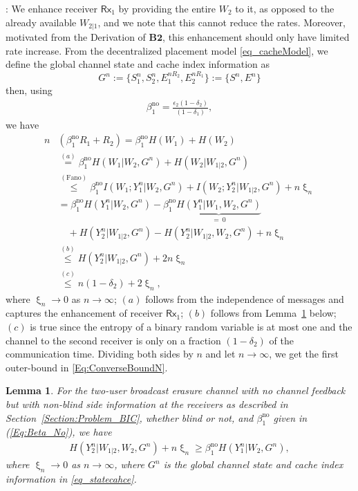 \documentclass[journal,12pt,draftcls,onecolumn]{IEEEtran}
\newtheorem{lemma}{Lemma}
\newcommand{\msf}{\mathsf}
\newcommand{\lp}{\left(}
\newcommand{\rp}{\right)}
\begin{document}
: We enhance receiver $\msf{Rx}_1$ by providing the entire $W_2$ to it, as opposed to the already available $W_{2|1}$, and we note that this cannot reduce the rates. Moreover, motivated from the Derivation of $\mathbf{B2}$, this enhancement should only have limited rate increase. From the decentralized placement model \eqref{eq_cacheModel}, we define the global channel state and cache index information as
\begin{equation} \label{eq_statecahce}
G^n:=\{S^n_1, S^n_2, E^{nR_2}_1, E^{nR_1}_2\}:=\{S^n, E^n\}
\end{equation}
then, using
\begin{align}
\beta_1^{\mathrm{no}} = \frac{\epsilon_2(1-\delta_2)}{(1-\delta_1)},
\end{align}
we have
\begin{align}
n &\left( \beta_1^{\mathrm{no}} R_1 + R_2 \right) = \beta_1^{\mathrm{no}} H(W_1) + H(W_2) \nonumber \\
& \overset{(a)}= \beta_1^{\mathrm{no}} H(W_1|W_2, G^n) + H(W_2|W_{1|2}, G^n) \nonumber \\
& \overset{(\mathrm{Fano})}\leq \beta_1^{\mathrm{no}} I(W_1;Y_1^n|W_2, G^n) + I(W_2;Y_2^n|W_{1|2}, G^n) + n \upxi_n \nonumber \\
& = \beta_1^{\mathrm{no}} H(Y_1^n|W_2, G^n) - \beta_1^{\mathrm{no}} \underbrace{H(Y_1^n|W_1,W_2,G^n)}_{=~0} \nonumber \\
& \quad + H(Y_2^n|W_{1|2},G^n) - H(Y_2^n|W_{1|2},W_2,G^n) + n \upxi_n \nonumber \\
& \overset{(b)}\leq H(Y_2^n|W_{1|2},G^n) + 2n \upxi_n \nonumber \\
& \overset{(c)}\leq n \left( 1 - \delta_2 \right) + 2\upxi_n,
\end{align}
where $\upxi_n \rightarrow 0$ as $n \rightarrow \infty$; $(a)$ follows from the independence of messages and captures the enhancement of receiver $\msf{Rx}_1$; $(b)$ follows from Lemma~\ref{Lemma:Leakage_BIC_No} below; $(c)$ is true since the entropy of a binary random variable is at most one and the channel to the second receiver is only on a fraction $\lp 1 - \delta_2 \rp$ of the communication time. Dividing both sides by $n$ and let $n \rightarrow \infty$, we get the first outer-bound in \eqref{Eq:ConverseBoundN}.

\begin{lemma}
\label{Lemma:Leakage_BIC_No}
For the two-user broadcast erasure channel with no channel feedback but with non-blind side information at the receivers as described in Section~\ref{Section:Problem_BIC}, whether blind or not, and $\beta_1^{\mathrm{no}}$ given in (\ref{Eq:Beta_No}), we have
\begin{align}
H\left( Y_2^n | W_{1|2}, W_2,G^n \right) + n \upxi_n \geq \beta_1^{\mathrm{no}} H\left( Y_1^n | W_2,G^n \right),
\end{align}
where $\upxi_n \rightarrow 0$ as $n \rightarrow \infty$, where $G^n$ is the global channel state and cache index information in \eqref{eq_statecahce}.
\end{lemma}
\end{document}
